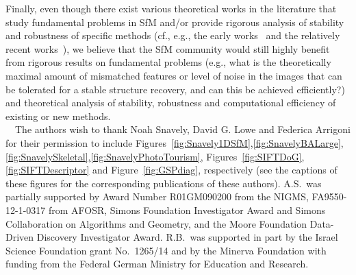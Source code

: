\documentclass[10pt]{article}
\begin{document}
Finally, even though there exist various theoretical works in the literature that study fundamental problems in SfM and/or provide rigorous analysis of stability and robustness of specific methods (cf., e.g., the early works~\cite{ChiusoSoattoOptimal,MaThy,SoattoVisualMotion} and the relatively recent works~\cite{CvXSfM,ShapeFit,ShapeFitJoint}), we believe that the SfM community would still highly benefit from rigorous results on fundamental problems (e.g., what is the theoretically maximal amount of mismatched features or level of noise in the images that can be tolerated for a stable structure recovery, and can this be achieved efficiently?) and theoretical analysis of stability, robustness and computational efficiency of existing or new methods.\\

 \ \ The authors wish to thank Noah Snavely, David G. Lowe and Federica Arrigoni for their permission to include  Figures~\ref{fig:Snavely1DSfM},\ref{fig:SnavelyBALarge},\ref{fig:SnavelySkeletal},\ref{fig:SnavelyPhotoTourism}, Figures~\ref{fig:SIFTDoG},\ref{fig:SIFTDescriptor} and Figure~\ref{fig:GSPdiag}, respectively (see the captions of these figures for the corresponding publications of these authors). A.S.~was partially supported by Award Number R01GM090200 from the NIGMS, FA9550-12-1-0317 from AFOSR, Simons Foundation Investigator Award and Simons Collaboration on Algorithms and Geometry, and the Moore Foundation Data-Driven Discovery Investigator Award. R.B.~was supported in part by the Israel Science Foundation grant No.~1265/14 and by the Minerva Foundation with funding from the Federal German Ministry for Education and Research. 


\newpage


\end{document}
